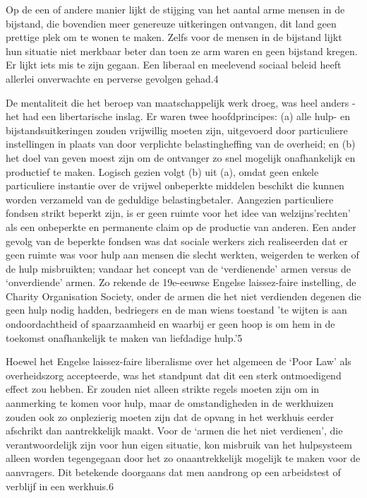 \documentclass[
  a5paper,
  smalldemyvopaper,10pt,twoside,onecolumn,openright,extrafontsizes,hidelinks]{memoir}
\renewenvironment{quote}%
               {\list{}{\rightmargin=.6cm\leftmargin=.6cm}%
                \itshape \item[]}%
               {\endlist}
\begin{document}
\begin{quote}
Op de een of andere manier lijkt de stijging van het aantal arme mensen
in de bijstand, die bovendien meer genereuze uitkeringen ontvangen, dit
land geen prettige plek om te wonen te maken. Zelfs voor de mensen in de
bijstand lijkt hun situatie niet merkbaar beter dan toen ze arm waren en
geen bijstand kregen. Er lijkt iets mis te zijn gegaan. Een liberaal en
meelevend sociaal beleid heeft allerlei onverwachte en perverse gevolgen
gehad.4
\end{quote}

De mentaliteit die het beroep van maatschappelijk werk droeg, was heel
anders - het had een libertarische inslag. Er waren twee hoofdprincipes:
(a) alle hulp- en bijstandsuitkeringen zouden vrijwillig moeten zijn,
uitgevoerd door particuliere instellingen in plaats van door verplichte
belastingheffing van de overheid; en (b) het doel van geven moest zijn
om de ontvanger zo snel mogelijk onafhankelijk en productief te maken.
Logisch gezien volgt (b) uit (a), omdat geen enkele particuliere
instantie over de vrijwel onbeperkte middelen beschikt die kunnen worden
verzameld van de geduldige belastingbetaler. Aangezien particuliere
fondsen strikt beperkt zijn, is er geen ruimte voor het idee van
welzijns'rechten' als een onbeperkte en permanente claim op de productie
van anderen. Een ander gevolg van de beperkte fondsen was dat sociale
werkers zich realiseerden dat er geen ruimte was voor hulp aan mensen
die slecht werkten, weigerden te werken of de hulp misbruikten; vandaar
het concept van de `verdienende' armen versus de `onverdiende' armen. Zo
rekende de 19e-eeuwse Engelse laissez-faire instelling, de Charity
Organisation Society, onder de armen die het niet verdienden degenen die
geen hulp nodig hadden, bedriegers en de man wiens toestand 'te wijten
is aan ondoordachtheid of spaarzaamheid en waarbij er geen hoop is om
hem in de toekomst onafhankelijk te maken van liefdadige hulp.'5

Hoewel het Engelse laissez-faire liberalisme over het algemeen de `Poor
Law' als overheidszorg accepteerde, was het standpunt dat dit een sterk
ontmoedigend effect zou hebben. Er zouden niet alleen strikte regels
moeten zijn om in aanmerking te komen voor hulp, maar de omstandigheden
in de werkhuizen zouden ook zo onplezierig moeten zijn dat de opvang in
het werkhuis eerder afschrikt dan aantrekkelijk maakt. Voor de `armen
die het niet verdienen', die verantwoordelijk zijn voor hun eigen
situatie, kon misbruik van het hulpsysteem alleen worden tegengegaan
door het zo onaantrekkelijk mogelijk te maken voor de aanvragers. Dit
betekende doorgaans dat men aandrong op een arbeidstest of verblijf in
een werkhuis.6
\end{document}
